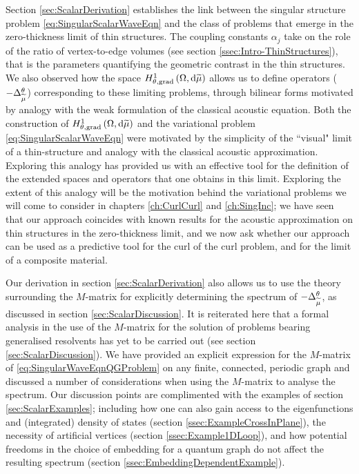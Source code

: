 Section \ref{sec:ScalarDerivation} establishes the link between the singular structure problem \eqref{eq:SingularScalarWaveEqn} and the class of problems that emerge in the zero-thickness limit of thin structures.
The coupling constants $\alpha_j$ take on the role of the ratio of vertex-to-edge volumes (see section \ref{ssec:Intro-ThinStructures}), that is the parameters quantifying the geometric contrast in the thin structures.
We also observed how the space $H^1_{\theta, \mathrm{grad}}\left( \Omega, \mathrm{d}\widetilde{\mu} \right)$ allows us to define operators ($-\Delta_{\widetilde{\mu}}^{\theta}$) corresponding to these limiting problems, through bilinear forms motivated by analogy with the weak formulation of the classical acoustic equation.
Both the construction of $H^1_{\theta, \mathrm{grad}}\left( \Omega, \mathrm{d}\widetilde{\mu} \right)$ and the variational problem \eqref{eq:SingularScalarWaveEqn} were motivated by the simplicity of the ``visual" limit of a thin-structure and analogy with the classical acoustic approximation.
Exploring this analogy has provided us with an effective tool for the definition of the extended spaces and operators that one obtains in this limit.
Exploring the extent of this analogy will be the motivation behind the variational problems we will come to consider in chapters \ref{ch:CurlCurl} and \ref{ch:SingInc}; we have seen that our approach coincides with known results for the acoustic approximation on thin structures in the zero-thickness limit, and we now ask whether our approach can be used as a predictive tool for the curl of the curl problem, and for the limit of a composite material.

Our derivation in section \ref{sec:ScalarDerivation} also allows us to use the theory surrounding the $M$-matrix for explicitly determining the spectrum of $-\Delta_{\widetilde{\mu}}^{\theta}$, as discussed in section \ref{sec:ScalarDiscussion}.
It is reiterated here that a formal analysis in the use of the $M$-matrix for the solution of problems bearing generalised resolvents has yet to be carried out (see section \ref{sec:ScalarDiscussion}).
We have provided an explicit expression for the $M$-matrix of \eqref{eq:SingularWaveEqnQGProblem} on any finite, connected, periodic graph and discussed a number of considerations when using the $M$-matrix to analyse the spectrum.
Our discussion points are complimented with the examples of section \ref{sec:ScalarExamples}; including how one can also gain access to the eigenfunctions and (integrated) density of states (section \ref{ssec:ExampleCrossInPlane}), the necessity of artificial vertices (section \ref{ssec:Example1DLoop}), and how potential freedoms in the choice of embedding for a quantum graph do not affect the resulting spectrum (section \ref{ssec:EmbeddingDependentExample}).


